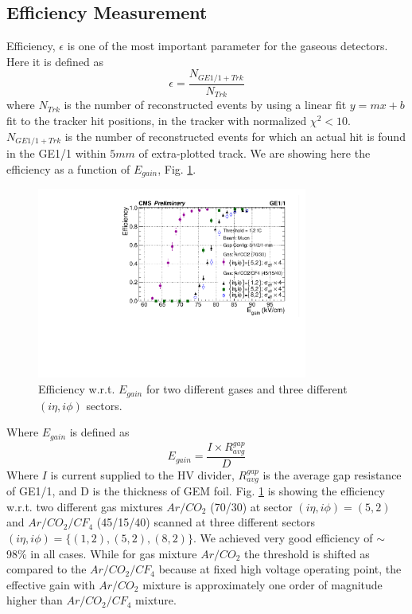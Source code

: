 \subsection{Efficiency Measurement}
Efficiency, $\epsilon$ is one of the most important parameter for the gaseous detectors. Here it is defined as 
\begin{equation}
\epsilon = \frac{N_{GE1/1+Trk}}{N_{Trk}}
\end{equation}
where $N_{Trk}$ is the number of reconstructed events by using a linear fit $y = mx + b$ fit to the tracker hit positions, in the tracker with normalized $\chi^2<10$.
$N_{GE1/1+Trk}$ is the number of reconstructed events for which an actual hit is found in the GE1/1 within $5mm$ of extra-plotted track.
We are showing here the efficiency as a function of $E_{gain}$, Fig. \ref{Efficiency}. 
\begin{figure}[!htbp]
\centering
\includegraphics[width=3.5in]{figures/GEM/EfficiencyPlot_wrt_EGain_wError4times_2gas.pdf}
\caption{Efficiency w.r.t. $E_{gain}$ for two different gases and three different $(i\eta,i\phi)$ sectors.}
\label{Efficiency}
\end{figure}
Where $E_{gain}$ is defined as
\begin{equation}
E_{gain} = \frac{I\times R_{avg}^{gap}}{D}
\end{equation}
Where $I$ is current supplied to the HV divider,
      $R_{avg}^{gap}$ is the average gap resistance of GE1/1,
      and D is the thickness of GEM foil.
      Fig. \ref{Efficiency} is showing the efficiency w.r.t. two different gas mixtures $Ar/CO_2$ (70/30) at sector $(i\eta,i\phi)=(5,2)$ and $Ar/CO_2/CF_4$ (45/15/40) scanned at three different sectors $(i\eta,i\phi)=\{(1,2),(5,2),(8,2)\}$. We achieved very good efficiency of $\sim$ 98\% in all cases. While for gas mixture $Ar/CO_2$ the threshold is shifted as compared to the $Ar/CO_2/CF_4$ because at fixed high voltage operating point, the effective gain with $Ar/CO_2$  mixture is approximately one order of magnitude higher than $Ar/CO_2/CF_4$ mixture.
      


